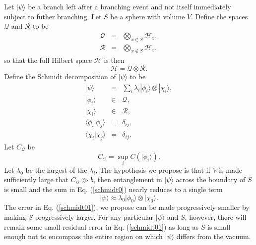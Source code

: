 \documentclass[12pt,amsmath,amssymb,onecolumn]{revtex4-2}
\begin{document}
Let $|\psi \rangle $ be a branch left after a branching event and not itself
immediately subject to futher branching. Let $S$ be
a sphere with volume $V$. Define the spaces $\mathcal{Q}$ and $\mathcal{R}$
to be
\begin{subequations}
  \begin{eqnarray}
    \label{defq3}
    \mathcal{Q} & = & \bigotimes_{x \in S} \mathcal{H}_x, \\
    \label{defr3}
    \mathcal{R} & = & \bigotimes_{x \notin S} \mathcal{H}_x,
  \end{eqnarray}
\end{subequations}
so that the full Hilbert space $\mathcal{H}$ is then
\begin{equation}
  \label{hyetagain}
  \mathcal{H} = \mathcal{Q} \otimes \mathcal{R}.
\end{equation}
Define the Schmidt decomposition of $|\psi \rangle $ to be
\begin{subequations}
  \begin{eqnarray}
    \label{schmidt0}
    |\psi \rangle  & = & \sum_i \lambda_i |\phi_i \rangle  \otimes |\chi_i \rangle , \\
    \label{schmidt1}
    |\phi_i \rangle  & \in & \mathcal{Q}, \\
    \label{schmidt2}
    |\chi_i \rangle  & \in & \mathcal{R}, \\
    \label{schmidt11}
     \langle  \phi_i | \phi_j \rangle  & = & \delta_{ij}, \\
     \label{schmidt21}
     \langle  \chi_i | \chi_j \rangle  & = & \delta_{ij}.
  \end{eqnarray}
\end{subequations}
Let $C_\mathcal{Q}$ be
\begin{equation}
  \label{defcv}
  C_\mathcal{Q} = \sup_i C( |\phi_i \rangle ).
\end{equation}
Let $\lambda_0$ be the largest of the $\lambda_i$.
The hypothesis we propose is that if $V$ is made sufficiently large
that $C_{\mathcal{Q}} \gg b$, then
entanglement in $|\psi \rangle $ across the boundary of $S$
is small and the sum in Eq. (\ref{schmidt0}) nearly reduces to a single term 
\begin{equation}
    \label{schmidt01}
    |\psi \rangle   \approx  \lambda_0 |\phi_0 \rangle  \otimes |\chi_0 \rangle .
\end{equation}
The error in Eq. (\ref{schmidt01}), 
we propose can be made progressively smaller
by making $S$ progressively larger.
For any particular $|\psi \rangle $ and $S$, however, there will
remain some small residual error in Eq. (\ref{schmidt01})
as long as $S$ is small enough not to encompass the
entire region on which $|\psi \rangle $ differs
from the vacuum.
\end{document}
